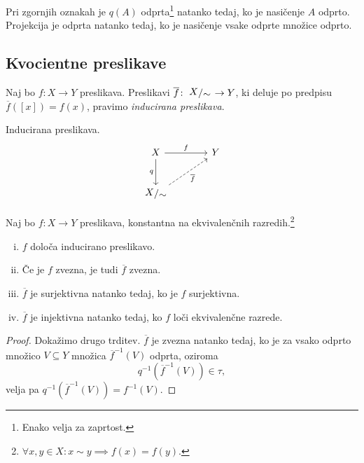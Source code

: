 \begin{trditev}
Pri zgornjih oznakah je $q(A)$ odprta\footnote{Enako velja za
zaprtost.} natanko tedaj, ko je nasičenje $A$ odprto. Projekcija
je odprta natanko tedaj, ko je nasičenje vsake odprte množice
odprto.
\end{trditev}

\obvs

\newpage

\subsection{Kvocientne preslikave}


\begin{definicija}
Naj bo $f \colon X \to Y$ preslikava. Preslikavi
$\overline{f} \colon \kvoc{X}{\sim} \to Y$, ki deluje po predpisu
$\overline{f}([x]) = f(x)$, pravimo
\emph{inducirana preslikava}.
\end{definicija}

\begin{skica}{Inducirana preslikava.}
\[
\begin{tikzcd}[column sep=large, row sep=large]
X \arrow[r, "f"] \arrow[d, "q"']                      & Y \\
\kvoc{X}{\sim} \arrow[ur, dashrightarrow, "\overline{f}"'] &
\end{tikzcd}
\]
\end{skica}

\begin{trditev}
Naj bo $f \colon X \to Y$ preslikava, konstantna na ekvivalenčnih
razredih.\footnote{
$\forall x, y \in X \colon x \sim y \implies f(x) = f(y)$.}

\begin{enumerate}[i)]
\item $f$ določa inducirano preslikavo.
\item Če je $f$ zvezna, je tudi $\overline{f}$ zvezna.
\item $\overline{f}$ je surjektivna natanko tedaj, ko je $f$
surjektivna.
\item $\overline{f}$ je injektivna natanko tedaj, ko $f$ loči
ekvivalenčne razrede.
\end{enumerate}
\end{trditev}

\begin{proof}
Dokažimo drugo trditev. $\overline{f}$ je zvezna natanko tedaj, ko
je za vsako odprto množico $V \subseteq Y$ množica
$\overline{f}^{-1}(V)$ odprta, oziroma
\[
q^{-1}\left(\overline{f}^{-1}(V)\right) \in \tau,
\]
velja pa $q^{-1}\left(\overline{f}^{-1}(V)\right) = f^{-1}(V)$.
\end{proof}

